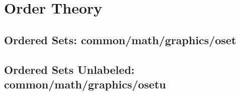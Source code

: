 \chapter{Order Theory}
\section{Ordered Sets: common/math/graphics/oset}

\section{Ordered Sets Unlabeled: common/math/graphics/osetu}

